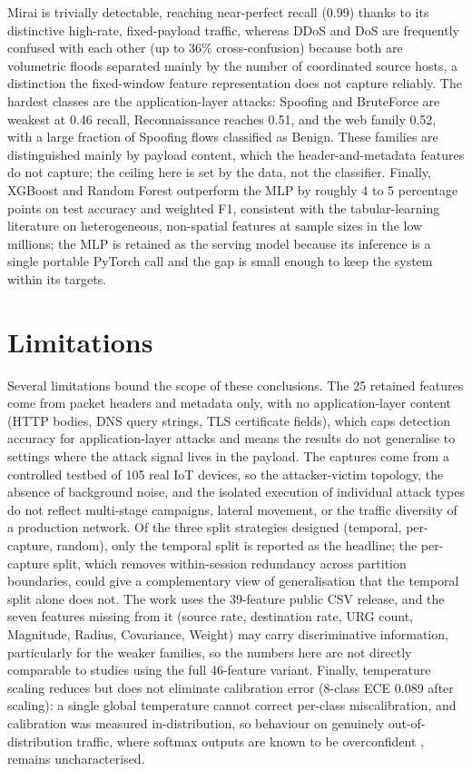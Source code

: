 \par Mirai is trivially detectable, reaching near-perfect recall (0.99) thanks to its distinctive high-rate, fixed-payload traffic, whereas DDoS and DoS are frequently confused with each other (up to 36\% cross-confusion) because both are volumetric floods separated mainly by the number of coordinated source hosts, a distinction the fixed-window feature representation does not capture reliably. The hardest classes are the application-layer attacks: Spoofing and BruteForce are weakest at 0.46 recall, Reconnaissance reaches 0.51, and the web family 0.52, with a large fraction of Spoofing flows classified as Benign. These families are distinguished mainly by payload content, which the header-and-metadata features do not capture; the ceiling here is set by the data, not the classifier. Finally, XGBoost and Random Forest outperform the MLP by roughly 4 to 5 percentage points on test accuracy and weighted F1, consistent with the tabular-learning literature on heterogeneous, non-spatial features at sample sizes in the low millions; the MLP is retained as the serving model because its inference is a single portable PyTorch call and the gap is small enough to keep the system within its targets.

\section{Limitations}
\label{sec:limitations}

\par Several limitations bound the scope of these conclusions. The 25 retained features come from packet headers and metadata only, with no application-layer content (HTTP bodies, DNS query strings, TLS certificate fields), which caps detection accuracy for application-layer attacks and means the results do not generalise to settings where the attack signal lives in the payload. The captures come from a controlled testbed of 105 real IoT devices, so the attacker-victim topology, the absence of background noise, and the isolated execution of individual attack types do not reflect multi-stage campaigns, lateral movement, or the traffic diversity of a production network. Of the three split strategies designed (temporal, per-capture, random), only the temporal split is reported as the headline; the per-capture split, which removes within-session redundancy across partition boundaries, could give a complementary view of generalisation that the temporal split alone does not. The work uses the 39-feature public CSV release, and the seven features missing from it (source rate, destination rate, URG count, Magnitude, Radius, Covariance, Weight) may carry discriminative information, particularly for the weaker families, so the numbers here are not directly comparable to studies using the full 46-feature variant. Finally, temperature scaling reduces but does not eliminate calibration error (8-class ECE 0.089 after scaling): a single global temperature cannot correct per-class miscalibration, and calibration was measured in-distribution, so behaviour on genuinely out-of-distribution traffic, where softmax outputs are known to be overconfident \cite{Guo2017}, remains uncharacterised.

